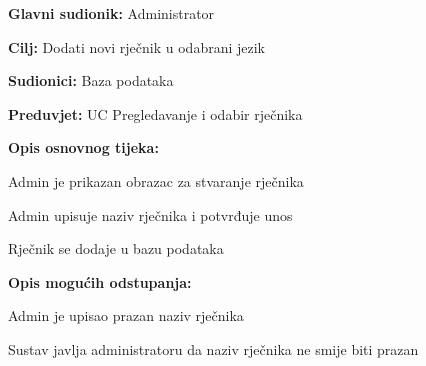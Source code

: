 \noindent {}
\begin{packed_item}

	\item \textbf{Glavni sudionik: } Administrator
	\item \textbf{Cilj: } Dodati novi rječnik u odabrani jezik
	\item \textbf{Sudionici: } Baza podataka
	\item \textbf{Preduvjet: } UC Pregledavanje i odabir rječnika
	\item  \textbf{Opis osnovnog tijeka:}
	
	\item[] \begin{packed_enum}
		
		\item Admin je prikazan obrazac za stvaranje rječnika
		\item Admin upisuje naziv rječnika i potvrđuje unos
		\item Rječnik se dodaje u bazu podataka

	\end{packed_enum}

	\item  \textbf{Opis mogućih odstupanja:}
	
	\item[] \begin{packed_item}

		\item[2.a] Admin je upisao prazan naziv rječnika
		\item[] \begin{packed_enum}
			
			\item Sustav javlja administratoru da naziv rječnika ne smije biti prazan
			
		\end{packed_enum}
		
	\end{packed_item}

\end{packed_item}

